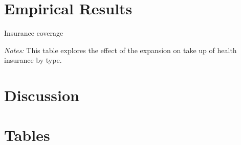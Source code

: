 \documentclass{article}
\begin{document}
\section{Empirical Results}


\begin{table}[h!]
\begin{centering}
\singlespacing
\caption{Insurance coverage}
\label{tab:cov}
\end{centering}
\begin{spacing}{1}
\begin{footnotesize}

\textit{Notes:} This table explores the effect of the expansion on take up of health insurance by type.
\end{footnotesize}
\end{spacing}
\end{table}

\section{Discussion}


\newpage


\newpage
\section{Tables}
\end{document}
